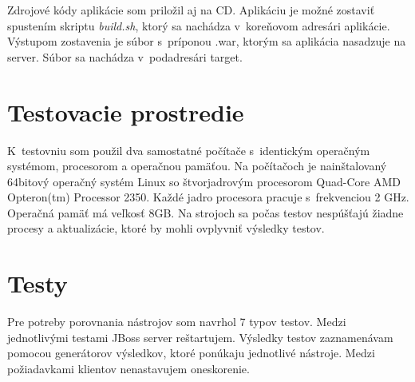 \documentclass[12pt,oneside,final]{fithesis-utf8}
\begin{document}
\par Zdrojové kódy aplikácie som priložil aj na CD. Aplikáciu je možné zostaviť spustením skriptu \textit{build.sh}, ktorý sa nachádza v~koreňovom adresári aplikácie. Výstupom zostavenia je súbor s~príponou .war, ktorým sa aplikácia nasadzuje na server. Súbor sa nachádza v~podadresári target.

\section{Testovacie prostredie}
K~testovniu som použil dva samostatné počítače s~identickým operačným systémom, procesorom a operačnou pamäťou. Na počítačoch je nainštalovaný 64bitový operačný systém Linux so štvorjadrovým procesorom Quad-Core AMD Opteron(tm) Processor 2350. Každé jadro procesora pracuje s~frekvenciou 2 GHz. Operačná pamäť má veľkosť 8GB. Na strojoch sa počas testov nespúšťajú žiadne procesy a aktualizácie, ktoré by mohli ovplyvniť výsledky testov.

\section{Testy}
Pre potreby porovnania nástrojov som navrhol 7 typov testov. Medzi jednotlivými testami JBoss server reštartujem. Výsledky testov zaznamenávam pomocou generátorov výsledkov, ktoré ponúkaju jednotlivé nástroje. Medzi požiadavkami klientov nenastavujem oneskorenie.
\newline
\end{document}
